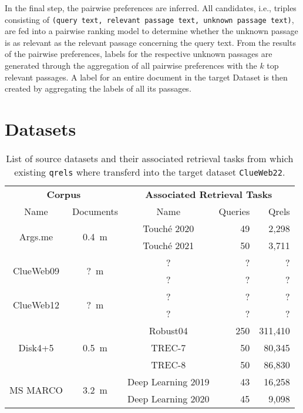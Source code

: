 In the final step, the pairwise preferences are inferred. All candidates, i.e., triples consisting of \texttt{(query text, relevant passage text, unknown passage text)}, are fed into a pairwise ranking model to determine whether the unknown passage is as relevant as the relevant passage concerning the query text. From the results of the pairwise preferences, labels for the respective unknown passages are generated through the aggregation of all pairwise preferences with the $k$ top relevant passages. A label for an entire document in the target Dataset is then created by aggregating the labels of all its passages.

\section{Datasets}\label{datasets}

\begin{table}[h!]
    \centering
    \caption{List of source datasets and their associated retrieval tasks from which existing \texttt{qrels} where transferd into the target dataset \texttt{ClueWeb22}.}
    \label{table:datasets}
    \begin{tabular}{cccrr}
        \toprule
        \multicolumn{2}{c}{\textbf{Corpus}} & \multicolumn{3}{c}{\textbf{ Associated Retrieval Tasks}} \\
        \cmidrule(lr){1-2} \cmidrule(lr){3-5}
        Name & Documents  & Name & Queries & Qrels \\
        \midrule
        
        \multirow{2}{*}{Args.me} & \multirow{2}{*}{0.4~m} & Touché 2020 & 49 & 2,298 \\
        & & Touché 2021 & 50 & 3,711\\

        \multirow{2}{*}{ClueWeb09} & \multirow{2}{*}{?~m} & ? & ? & ? \\
        & & ? & ? & ? \\

        \multirow{2}{*}{ClueWeb12} & \multirow{2}{*}{?~m} & ? & ? & ? \\
        & & ? & ? & ? \\

        \multirow{3}{*}{Disk4+5} & \multirow{3}{*}{0.5~m} & Robust04 & 250 & 311,410 \\
        & & TREC-7 & 50 & 80,345 \\
        & & TREC-8 & 50 & 86,830 \\

        \multirow{2}{*}{MS MARCO} & \multirow{2}{*}{3.2~m} & Deep Learning 2019 & 43 & 16,258 \\
        & & Deep Learning 2020 & 45 & 9,098 \\
        
        \bottomrule
    \end{tabular}
\end{table}

